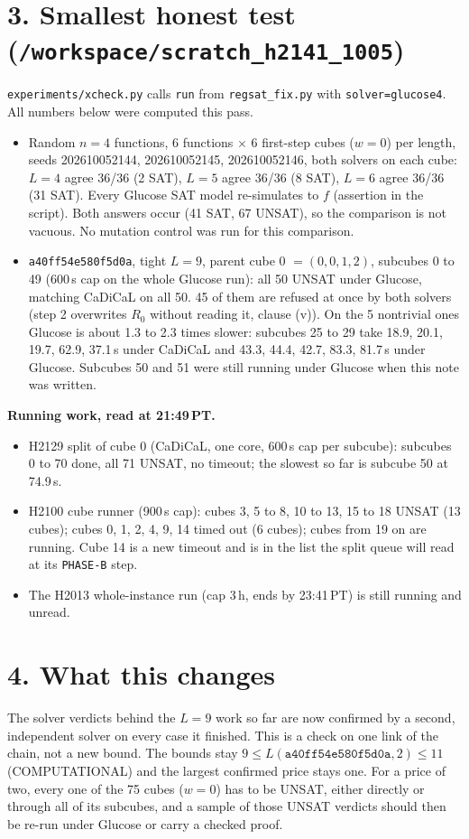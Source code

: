 \documentclass[11pt]{article}
\begin{document}
\section*{3. Smallest honest test (\texttt{/workspace/scratch\_h2141\_1005})}
\texttt{experiments/xcheck.py} calls \texttt{run} from \texttt{regsat\_fix.py} with \texttt{solver=glucose4}. All numbers below were computed this pass.
\begin{itemize}
\item Random $n=4$ functions, 6 functions $\times$ 6 first-step cubes ($w=0$) per length, seeds 202610052144, 202610052145, 202610052146, both solvers on each cube: $L=4$ agree 36/36 (2 SAT), $L=5$ agree 36/36 (8 SAT), $L=6$ agree 36/36 (31 SAT). Every Glucose SAT model re-simulates to $f$ (assertion in the script). Both answers occur (41 SAT, 67 UNSAT), so the comparison is not vacuous. No mutation control was run for this comparison.
\item \texttt{a40ff54e580f5d0a}, tight $L=9$, parent cube 0 $=(0,0,1,2)$, subcubes 0 to 49 (600\,s cap on the whole Glucose run): all 50 UNSAT under Glucose, matching CaDiCaL on all 50. 45 of them are refused at once by both solvers (step 2 overwrites $R_0$ without reading it, clause (v)). On the 5 nontrivial ones Glucose is about 1.3 to 2.3 times slower: subcubes 25 to 29 take 18.9, 20.1, 19.7, 62.9, 37.1\,s under CaDiCaL and 43.3, 44.4, 42.7, 83.3, 81.7\,s under Glucose. Subcubes 50 and 51 were still running under Glucose when this note was written.
\end{itemize}

\textbf{Running work, read at 21:49\,PT.}
\begin{itemize}
\item H2129 split of cube 0 (CaDiCaL, one core, 600\,s cap per subcube): subcubes 0 to 70 done, all 71 UNSAT, no timeout; the slowest so far is subcube 50 at 74.9\,s.
\item H2100 cube runner (900\,s cap): cubes 3, 5 to 8, 10 to 13, 15 to 18 UNSAT (13 cubes); cubes 0, 1, 2, 4, 9, 14 timed out (6 cubes); cubes from 19 on are running. Cube 14 is a new timeout and is in the list the split queue will read at its \texttt{PHASE-B} step.
\item The H2013 whole-instance run (cap 3\,h, ends by 23:41\,PT) is still running and unread.
\end{itemize}

\section*{4. What this changes}
The solver verdicts behind the $L=9$ work so far are now confirmed by a second, independent solver on every case it finished. This is a check on one link of the chain, not a new bound. The bounds stay $9\le L(\texttt{a40ff54e580f5d0a},2)\le 11$ (COMPUTATIONAL) and the largest confirmed price stays one. For a price of two, every one of the 75 cubes ($w=0$) has to be UNSAT, either directly or through all of its subcubes, and a sample of those UNSAT verdicts should then be re-run under Glucose or carry a checked proof.
\end{document}
